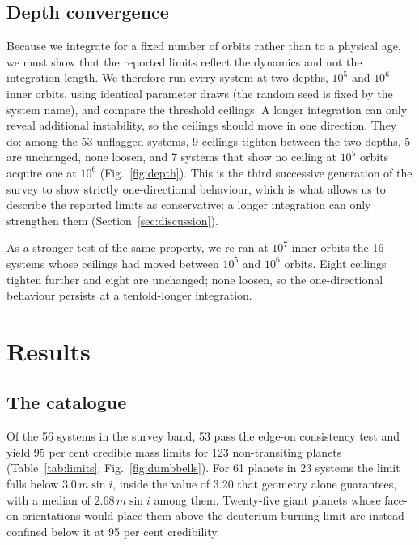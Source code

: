 \documentclass[fleqn,usenatbib]{mnras}
\newcommand{\msini}{m\sin i}
\begin{document}
\subsection{Depth convergence} \label{sec:depth}

Because we integrate for a fixed number of orbits rather than to a
physical age, we must show that the reported limits reflect the dynamics
and not the integration length. We therefore run every system at two
depths, $10^5$ and $10^6$ inner orbits, using identical parameter draws
(the random seed is fixed by the system name), and compare the threshold
ceilings. A longer integration can only reveal additional instability, so
the ceilings should move in one direction. They do: among the 53 unflagged
systems, 9 ceilings tighten between the two depths, 5 are unchanged, none
loosen, and 7 systems that show no ceiling at $10^5$ orbits acquire one at
$10^6$ (Fig.~\ref{fig:depth}). This is the third successive generation of
the survey to show strictly one-directional behaviour, which is what
allows us to describe the reported limits as conservative: a longer
integration can only strengthen them (Section~\ref{sec:discussion}).

As a stronger test of the same property, we re-ran at $10^7$ inner orbits
the 16 systems whose ceilings had moved between $10^5$ and $10^6$ orbits.
Eight ceilings tighten further and eight are unchanged; none loosen, so
the one-directional behaviour persists at a tenfold-longer integration.

\section{Results} \label{sec:results}

\subsection{The catalogue} \label{sec:catalog}

Of the 56 systems in the survey band, 53 pass the edge-on consistency test
and yield 95 per cent credible mass limits for 123 non-transiting planets
(Table~\ref{tab:limits}; Fig.~\ref{fig:dumbbells}). For 61 planets in 23
systems the limit falls below $3.0\,\msini$, inside the value of 3.20 that
geometry alone guarantees, with a median of $2.68\,\msini$ among them.
Twenty-five giant planets whose face-on orientations would place them
above the deuterium-burning limit are instead confined below it at 95 per
cent credibility.
\end{document}
